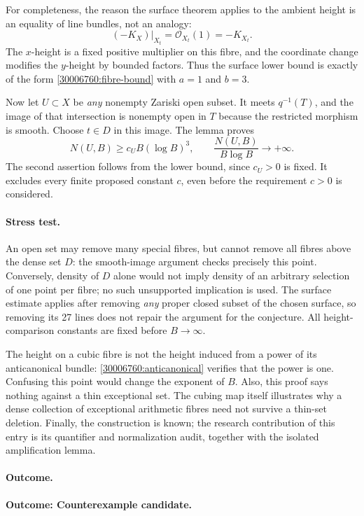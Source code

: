 \documentclass[11pt,a4paper]{article}
\numberwithin{equation}{section}
\begin{document}
For completeness, the reason the surface theorem applies to the ambient
height is an equality of line bundles, not an analogy:
\[
 (-K_X)|_{X_t}=\mathcal O_{X_t}(1)=-K_{X_t}.
\]
The $x$-height is a fixed positive multiplier on this fibre, and the
coordinate change modifies the $y$-height by bounded factors. Thus the
surface lower bound is exactly of the form \eqref{30006760:fibre-bound} with
$a=1$ and $b=3$.

Now let $U\subset X$ be \emph{any} nonempty Zariski open subset. It meets
$q^{-1}(T)$, and the image of that intersection is nonempty open in $T$
because the restricted morphism is smooth. Choose $t\in D$ in this
image. The lemma proves
\begin{equation}\label{30006760:contradiction}
 N(U,B)\ge c_U B(\log B)^3,
 \qquad
 \frac{N(U,B)}{B\log B}\longrightarrow+\infty.
\end{equation}
The second assertion follows from the lower bound, since $c_U>0$ is fixed.
It excludes every finite proposed constant $c$, even before the requirement
$c>0$ is considered.

\paragraph{Stress test.}
An open set may remove many special fibres, but cannot remove all fibres
above the dense set $D$: the smooth-image argument checks precisely this
point. Conversely, density of $D$ alone would not imply density of an
arbitrary selection of one point per fibre; no such unsupported implication
is used. The surface estimate applies after removing \emph{any} proper
closed subset of the chosen surface, so removing its 27 lines does not
repair the argument for the conjecture. All height-comparison constants
are fixed before $B\to\infty$.

The height on a cubic fibre is not the height induced from a power of its
anticanonical bundle: \eqref{30006760:anticanonical} verifies that the power is
one. Confusing this point would change the exponent of $B$. Also, this
proof says nothing against a thin exceptional set. The cubing map itself
illustrates why a dense collection of exceptional arithmetic fibres need
not survive a thin-set deletion. Finally, the construction is known; the
research contribution of this entry is its quantifier and normalization
audit, together with the isolated amplification lemma.

\paragraph{Outcome.}
\textbf{Outcome: Counterexample candidate.}
\end{document}
